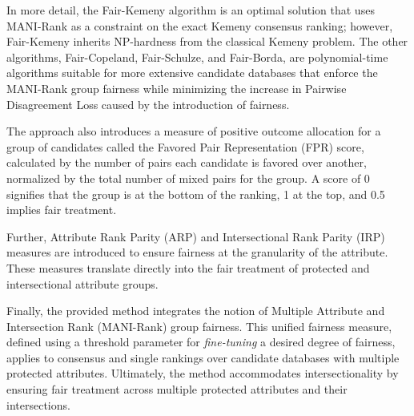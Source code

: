 In more detail, the Fair-Kemeny algorithm is an optimal solution that uses MANI-Rank as a constraint on the exact Kemeny consensus ranking; however, Fair-Kemeny inherits NP-hardness from the classical Kemeny problem. The other algorithms, Fair-Copeland, Fair-Schulze, and Fair-Borda, are polynomial-time algorithms suitable for more extensive candidate databases that enforce the MANI-Rank group fairness while minimizing the increase in Pairwise Disagreement Loss caused by the introduction of fairness.

The approach also introduces a measure of positive outcome allocation for a group of candidates called the Favored Pair Representation (FPR) score, calculated by the number of pairs each candidate is favored over another, normalized by the total number of mixed pairs for the group. A score of 0 signifies that the group is at the bottom of the ranking, 1 at the top, and 0.5 implies fair treatment.

Further, Attribute Rank Parity (ARP) and Intersectional Rank Parity (IRP) measures are introduced to ensure fairness at the granularity of the attribute. These measures translate directly into the fair treatment of protected and intersectional attribute groups.

Finally, the provided method integrates the notion of Multiple Attribute and Intersection Rank (MANI-Rank) group fairness. This unified fairness measure, defined using a threshold parameter for \emph{fine-tuning} a desired degree of fairness, applies to consensus and single rankings over candidate databases with multiple protected attributes.
Ultimately, the method accommodates intersectionality by ensuring fair treatment across multiple protected attributes and their intersections. 





